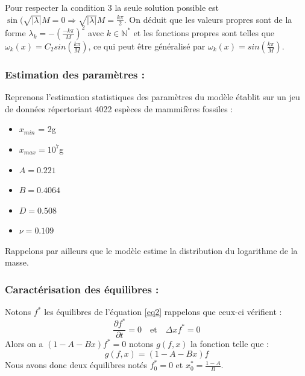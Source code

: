 \documentclass[fleqn,10pt]{SelfArx}
\begin{document}
Pour respecter la condition 3 la seule solution possible est $\sin(\sqrt{|\lambda |}M =0 \Rightarrow \sqrt{|\lambda |}M = \frac{k\pi}{2} $. On déduit que les valeurs propres sont de la forme $\lambda_k =- (\frac{-k\pi}{M})^2$ avec $k\in \mathbb{N^*}$ et les fonctions propres sont telles que $\omega_k(x)=C_2 sin (\frac{k\pi}{M})$, ce qui peut être généralisé par $\omega_k(x)= sin (\frac{k\pi}{M})$.\\

\subsubsection*{Estimation des paramètres :} 
Reprenons l’estimation statistiques des paramètres du modèle établit sur un jeu de données répertoriant 4022 espèces de mammifères fossiles \cite{clauset2008evolution} :
\begin{itemize}
\item $x_{min}$ = 2g
\item $x_{max}= 10^7$g
\item $A = 0.221$
\item $B = 0.4064 $
\item $D = 0.508 $
\item $\nu = 0.109 $ 
\end{itemize}
Rappelons par ailleurs que le modèle estime la distribution du logarithme de la masse.
\subsubsection*{Caractérisation des équilibres :} 
Notons $f^*$ les équilibres de l'équation \ref{eq2} rappelons que ceux-ci vérifient :
$$\frac{\partial f^*}{\partial t} =0 \quad \text{et} \quad \Delta xf^*=0 $$
Alors on a $(1-A-Bx)f^*=0$ notons $g(f,x)$ la fonction telle que : 
$$g(f,x) =(1-A-Bx)f$$
Nous avons donc deux équilibres notés $f^*_0=0$ et $x^*_0=  \frac{1-A}{B}$. 
\end{document}
